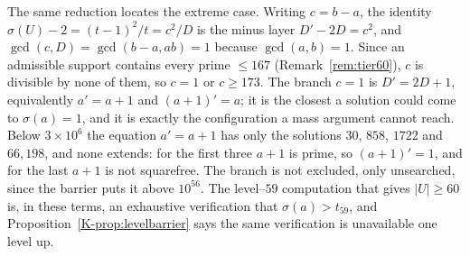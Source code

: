 \documentclass[11pt]{article}
\theoremstyle{definition}
\begin{document}
The same reduction locates the extreme case. Writing $c=b-a$, the identity
$\sigma(U)-2=(t-1)^2/t=c^2/D$ is the minus layer $D'-2D=c^2$, and $\gcd(c,D)=\gcd(b-a,ab)=1$ because
$\gcd(a,b)=1$. Since an admissible support contains every prime $\le167$
\textup{(}Remark~\ref{rem:tier60}\textup{)}, $c$ is divisible by none of them, so $c=1$ or
$c\ge173$. The branch $c=1$ is $D'=2D+1$, equivalently $a'=a+1$ and $(a+1)'=a$; it is the closest a
solution could come to $\sigma(a)=1$, and it is exactly the configuration a mass argument cannot
reach. Below $3\times10^{6}$ the equation $a'=a+1$ has only the solutions $30$, $858$, $1722$ and
$66{,}198$, and none extends: for the first three $a+1$ is prime, so $(a+1)'=1$, and for the last
$a+1$ is not squarefree. The branch is not excluded, only unsearched, since the barrier puts it above
$10^{56}$. The level--$59$
computation that gives $|U|\ge60$ is, in these terms, an exhaustive verification that
$\sigma(a)>t_{59}$, and Proposition~\ref{K-prop:levelbarrier} says the same verification is unavailable
one level up.
\end{document}
